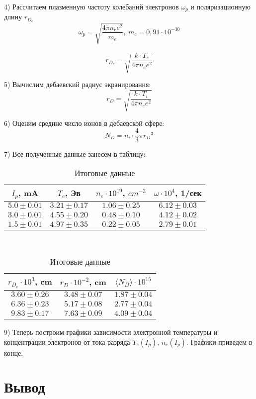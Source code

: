 4) Рассчитаем плазменную частоту колебаний электронов $\omega_p$ и поляризационную длину $r_{D_e}$
\[\omega_p = \sqrt{\dfrac{4\pi n_e e^2}{m_e}},\ m_e = 0,91 \cdot 10^{-30}\]


\[r_{D_e} = \sqrt{\dfrac{k\cdot T_e}{4\pi n_e e^2}}\]

5) Вычислим дебаевский радиус экранирования:
\[r_{D} = \sqrt{\dfrac{k\cdot T_i}{4\pi n_e e^2}}\]


6) Оценим среднне число ионов в дебаевской сфере:
\[N_D = n_i \cdot \dfrac{4}{3} \pi {r_D}^3\]

7) Все полученные данные занесем в таблицу:




\begin{table}[h]
\centering
\begin{tabular}{|c|c|c|c|}
\hline
$I_p$, mA & $T_e$, Эв & $n_e\cdot 10^{19}$, $cm^{-3}$ & $\omega \cdot 10^4$, 1/сек \\ \hline
$5.0 \pm 0.01$ & $3.21 \pm 0.17$ & $1.06 \pm 0.25$ & $6.12 \pm 0.03$ \\ \hline
$3.0 \pm 0.01$ & $4.55 \pm 0.20$ & $0.48 \pm 0.10$ & $4.12 \pm 0.02$ \\ \hline
$1.5 \pm 0.01$ & $4.97 \pm 0.35$ & $0.22 \pm 0.05$ & $2.79 \pm 0.01$ \\ \hline
\end{tabular}\\

\begin{tabular}{|c|c|c|}
\hline
$r_{D_e}\cdot 10^3$, cm & $r_D\cdot 10^{-2}$, cm & $\langle N_D \rangle\cdot 10^{15}$\\ \hline
$3.60 \pm 0.26$ & $3.48 \pm 0.07$ & $1.87 \pm 0.04$ \\ \hline
$6.36 \pm 0.23$ & $5.17 \pm 0.08$ & $2.77 \pm 0.04$ \\ \hline
$9.83 \pm 0.17$ & $7.63 \pm 0.09$ & $4.09 \pm 0.04$ \\ \hline
\end{tabular}
\caption{Итоговые данные\\}
\end{table} 


9) Теперь построим графики зависимости электронной температуры и концентрации электронов от тока разряда $T_e(I_p)$, $n_e(I_p)$. Графики приведем в конце.

\section{{Вывод}}

